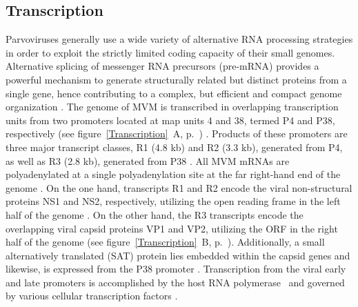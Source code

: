\subsection{Transcription}
Parvoviruses generally use a wide variety of alternative RNA processing strategies in order to exploit the strictly limited coding capacity of their small genomes. Alternative splicing of messenger RNA precursors (pre-mRNA) provides a powerful mechanism to generate structurally related but distinct proteins from a single gene, hence contributing to a complex, but efficient and compact genome organization \cite{pmid2694943, pmid1335742}. The genome of MVM is transcribed in overlapping transcription units from two promoters located at map units 4 and 38, termed P4 and P38, respectively (see figure~\ref{Transcription}~A, p.~\pageref{Transcription}) \cite{pmid6828378}. Products of these promoters are three major transcript classes, R1 (4.8 kb) and R2 (3.3 kb), generated from P4, as well as R3 (2.8 kb), generated from P38 \cite{pmid3951017}. All MVM mRNAs are polyadenylated at a single polyadenylation site at the far right-hand end of the genome \cite{pmid3660591, pmid3502703}. On the one hand, transcripts R1 and R2 encode the viral non-structural proteins NS1 and NS2, respectively, utilizing the open reading frame in the left half of the genome \cite{pmid2939261}. On the other hand, the R3 transcripts encode the overlapping viral capsid proteins VP1 and VP2, utilizing the ORF in the right half of the genome (see figure~\ref{Transcription}~B, p.~\pageref{Transcription}). Additionally, a small alternatively translated (SAT) protein lies embedded within the capsid genes and likewise, is expressed from the P38 promoter \cite{pmid16189014}. Transcription from the viral early and late promoters is accomplished by the host RNA polymerase~ \cite{pmid6828378, polII} and governed by various cellular transcription factors \cite{pmid2585609, pmid8009857, pmid2325201, pmid7983715, pmid1942250}. 

